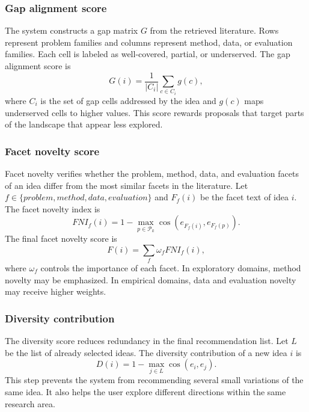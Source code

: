 \documentclass[preprint,12pt]{elsarticle}
\begin{document}
\subsubsection{Gap alignment score}

The system constructs a gap matrix $G$ from the retrieved literature. Rows represent problem families and columns represent method, data, or evaluation families. Each cell is labeled as well-covered, partial, or underserved. The gap alignment score is
\begin{equation}
  G(i) = \frac{1}{|C_i|}\sum_{c \in C_i} g(c),
\end{equation}
where $C_i$ is the set of gap cells addressed by the idea and $g(c)$ maps underserved cells to higher values. This score rewards proposals that target parts of the landscape that appear less explored.

\subsubsection{Facet novelty score}

Facet novelty verifies whether the problem, method, data, and evaluation facets of an idea differ from the most similar facets in the literature. Let $f \in \{problem, method, data, evaluation\}$ and $F_f(i)$ be the facet text of idea $i$. The facet novelty index is
\begin{equation}
  FNI_f(i) = 1 - \max_{p \in \mathcal{P}_k}\cos(e_{F_f(i)},e_{F_f(p)}).
\end{equation}
The final facet novelty score is
\begin{equation}
  F(i) = \sum_f \omega_f FNI_f(i),
\end{equation}
where $\omega_f$ controls the importance of each facet. In exploratory domains, method novelty may be emphasized. In empirical domains, data and evaluation novelty may receive higher weights.

\subsubsection{Diversity contribution}

The diversity score reduces redundancy in the final recommendation list. Let $L$ be the list of already selected ideas. The diversity contribution of a new idea $i$ is
\begin{equation}
  D(i) = 1 - \max_{j \in L}\cos(e_i,e_j).
\end{equation}
This step prevents the system from recommending several small variations of the same idea. It also helps the user explore different directions within the same research area.
\end{document}
